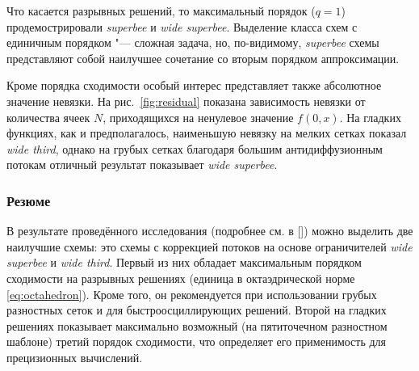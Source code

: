 Что касается разрывных решений, то максимальный порядок (\(q=1\)) продемострировали \textit{superbee} и \textit{wide superbee}.
Выделение класса схем с единичным порядком "--- сложная задача, но, по-видимому,
\textit{superbee} схемы представляют собой наилучшее сочетание со вторым порядком аппроксимации.

Кроме порядка сходимости особый интерес представляет также абсолютное значение невязки.
На рис.~\ref{fig:residual} показана зависимость невязки от количества ячеек \(N\), приходящихся на ненулевое значение \(f(0,x)\).
На гладких функциях, как и предполагалось, наименьшую невязку на мелких сетках показал \textit{wide third},
однако на грубых сетках благодаря большим антидиффузионным потокам отличный результат показывает \textit{wide superbee}.

\subsubsection{Резюме}

В результате проведённого исследования (подробнее см. в []) можно выделить две наилучшие схемы:
это схемы с коррекцией потоков на основе ограничителей \textit{wide superbee} и \textit{wide third}.
Первый из них обладает максимальным порядком сходимости на разрывных решениях (единица в октаэдрической норме \eqref{eq:octahedron}).
Кроме того, он рекомендуется при использовании грубых разностных сеток и для быстроосциллирующих решений.
Второй на гладких решениях показывает максимально возможный (на пятиточечном разностном шаблоне) третий порядок сходимости,
что определяет его применимость для прецизионных вычислений.

